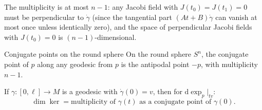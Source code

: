 
\begin{colremark}{}{}
The multiplicity is at most $n - 1$: any Jacobi field with $J(t_0) = J(t_1) = 0$ must be perpendicular to $\dot\gamma$ (since the tangential part $(At + B)\dot\gamma$ can vanish at most once unless identically zero), and the space of perpendicular Jacobi fields with $J(t_0) = 0$ is $(n-1)$-dimensional.
\end{colremark}



\begin{colexample}{Conjugate points on the round sphere}{}
On the round sphere $S^n$, the conjugate point of $p$ along any geodesic from $p$ is the antipodal point $-p$, with multiplicity $n - 1$. 
\end{colexample}

\begin{colremark}{}{}
If $\gamma \colon [0, \ell] \to M$ is a geodesic with $\dot{\gamma}(0) = v$, then for $\mathrm{d}\exp_p\big|_{tv}$:
\[
\dim \ker = \text{multiplicity of } \gamma(t) \text{ as a conjugate point of } \gamma(0).
\]
\end{colremark}










